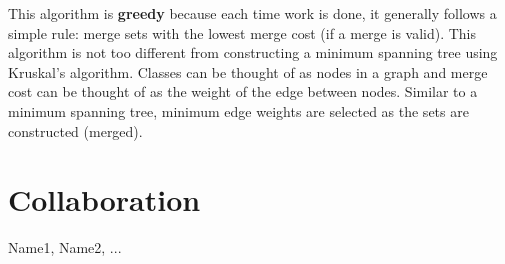 \documentclass[11pt, oneside]{article}   	%
\begin{document}
This algorithm is {\bf greedy} because each time work is done, it generally follows a simple rule: merge sets with the lowest merge cost (if a merge is valid). This algorithm is not too different from constructing a minimum spanning tree using Kruskal's algorithm. Classes can be thought of as nodes in a graph and merge cost can be thought of as the weight of the edge between nodes. Similar to a minimum spanning tree, minimum edge weights are selected as the sets are constructed (merged). 
\section*{Collaboration}
Name1, Name2, ...
\end{document}
